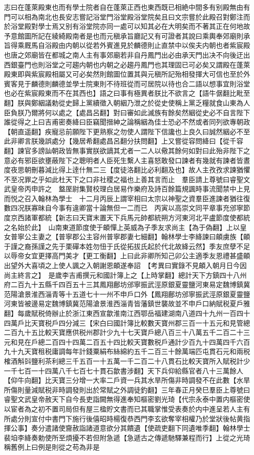 志曰在蓬萊殿東也而有學士院者自在蓬萊正西也東西既已相絶中間多有别殿無由有門可以相為南北也長安志嘗記浴堂門浴堂殿浴堂院矣且曰文宗嘗於此殿召對鄭注而於浴堂殿對學士焉又别有浴堂院亦同一處可以知其必在大明矣而不著其正在何地故予意館圖所記在綾綺殿南者是也而元稹承旨廳記又有可證者其說曰乘輿奉郊廟則承旨得乘厩馬自浴殿由内朝以從若外賓進見於麟德則止直禁中以俟夫内朝也者紫宸殿也唐之郊廟皆在都城之南人主有事郊廟若非自丹鳳門出必由承天門出决不向後迂出西銀臺門也則浴堂之可趨内朝也内朝之必趨丹鳳門也其理固已可必矣又謂殿在蓬萊殿東即與紫宸殿相屬又可必矣然則館圖位置其與元稹所記殆相發揮大可信也至於外賓客見于麟德則麟德並學士院東則不待班從而可居院以待也合二語以想事宜則浴堂也必在紫宸殿東而不在其西也】語之曰事有極異者朕比不欲言之【語牛倨翻比毗至翻】朕與鄭絪議勅從史歸上黨續徵入朝絪乃泄之於從史使稱上黨乏糧就食山東為人臣負朕乃爾將何以處之【處昌呂翻】對曰審如此滅族有餘矣然絪從史必不自言陛下誰從得之上曰吉甫密奏絳曰臣竊聞搢紳之論稱絪為佳士恐必不然或者同列欲專朝政【朝直遥翻】疾寵忌前願陛下更熟察之勿使人謂陛下信讒也上良久曰誠然絪必不至此非卿言朕幾誤處分【幾居希翻處昌呂翻分扶問翻】上又嘗從容問絳曰【從千容翻】諫官多謗訕朝政皆無事實朕欲謫其尤者一二人以儆其餘何如對曰此殆非陛下之意必有邪臣欲壅蔽陛下之聰明者人臣死生繫人主喜怒敢發口諫者有幾就有諫者皆晝度夜思朝刪暮減比得上逹什無二三【度徒洛翻比必利翻及也】故人主孜孜求諫猶懼不至况罪之乎如此杜天下之口非社稷之福也上善其言而止　羣臣請上尊號曰睿聖文武皇帝丙申許之　盩厔尉集賢校理白居易作樂府及詩百餘篇規諷時事流聞禁中上見而悦之召入翰林為學士　十二月丙辰上謂宰相曰太宗以神聖之資羣臣進諫者猶往復數四况朕寡昧自今事有違卿當十論無但一二而已　丙寅以高崇文同平章事充邠寧節度京西諸軍都統【新志曰天寶末置天下兵馬元帥都統朔方河東河北平盧節度使都統之名始於此】　山南東道節度使于頔憚上英威為子季友求尚主【為于偽翻】上以皇女普寧公主妻之【普寧郡公主容州普寧郡妻七細翻】翰林學士李絳諫曰頔虜族【頔于謹之裔孫謹之先于栗磾本姓勿忸于氏從拓拔氏起於代北故絳云然】季友庶孽不足以辱帝女宜更擇高門美才【更工衡翻】上曰此非卿所知己卯公主適季友恩禮甚盛頔出望外大喜頃之上使人諷之入朝謝恩頔遂奉詔　【考異曰實錄不見頔入朝月日今因尚主終言之】　是歲李吉甫撰元和國計簿上之【上時掌翻】總計天下方鎮四十八州府二百九十五縣千四百五十三其鳳翔鄜坊邠寧振武涇原銀夏靈鹽河東易定魏博鎮冀范陽滄景淮西淄青等十五道七十一州不申戶口外【鳳翔鄜坊邠寧振武涇原銀夏靈鹽河東皆被邊易定魏博鎮冀范陽滄景淮西淄青皆藩鎮世襲故並不申戶口納賦税夏戶雅翻】每歲賦税倚辦止於浙江東西宣歙淮南江西鄂岳福建湖南八道四十九州一百四十四萬戶比天寶税戶四分減三【宋白曰國計簿比較數天寶州郡三百一十五元和見管總二百九十五比較天寶應供税州郡計少九十七天寶戶總八百三十八萬五千二百二十三元和見在戶總二百四十四萬二百五十四比較天寶數税戶通計少百九十四萬四千六百九十九天寶租税庸調每年計錢粟絹布絲綿約五千二百三十餘萬端匹屯貫石元和兩税榷酒斛㪷鹽利茶利總三千五百一十五萬一千二百二十八貫石比較天寶所入賦税計少一千七百一十四萬八千七百七十貫石歙書涉翻】天下兵仰給縣官者八十三萬餘人【仰牛向翻】比天寶三分增一大率二戶資一兵其水旱所傷非時調發不在此數【水旱所傷則量減賦税非時調發則出於常賦之外調徒釣翻】三年春正月癸巳羣臣上尊號曰睿聖文武皇帝赦天下自今長吏詣闕無得進奉知樞密劉光琦【代宗永泰中置内樞密使以宦者為之初不置司局但有屋三楹貯文書而已其職掌惟受表奏於内中進呈若人主有所處分則宣付中書門下施行後僖昭時楊復恭西門李玄欲奪宰相權乃於堂狀後帖黄指揮公事】奏分遣諸使齎赦詣諸道意欲分其饋遺【使疏吏翻下同遺唯季翻】翰林學士裴垍李絳奏勅使所至煩擾不若但附急遞【急遞古之傳遞馳驛兼程而行】上從之光琦稱舊例上曰例是則從之苟為非是